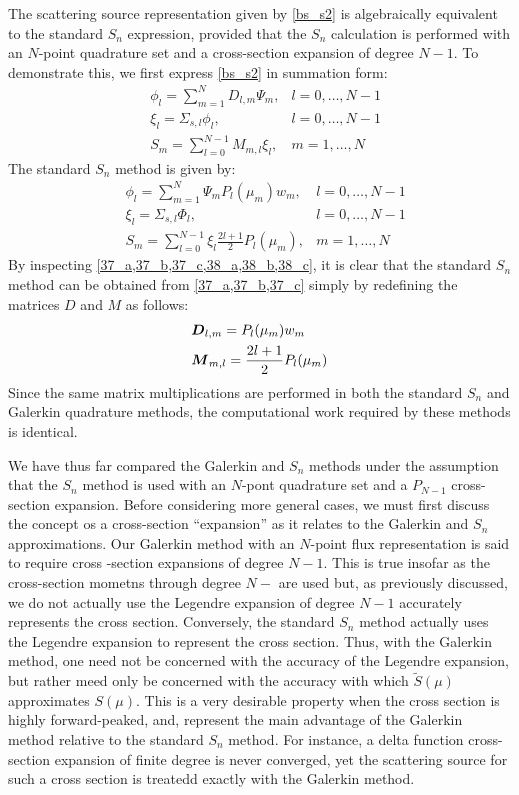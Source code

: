 The scattering source representation given by \cref{bs_s2} is
algebraically equivalent to the standard $S_n$ expression, provided that the
$S_n$ calculation is performed with an $N$-point quadrature set and a
cross-section expansion of degree $N-1$. To demonstrate this, we first express
\cref{bs_s2} in summation form:
\begin{align}
&\phi_l = \sum_{m=1}^N D_{l,m} \Psi_m, & l=0,\hdots,N-1 \label{37_a}\\
&\xi_l = \Sigma_{s,l} \phi_l, & l=0,\hdots,N-1 \label{37_b}\\
&S_m = \sum_{l=0}^{N-1} M_{m,l}\xi_l, & m=1,\hdots,N \label{37_c}
\end{align}
The standard $S_n$ method is given by:
\begin{align}
&\phi_l = \sum_{m=1}^N \Psi_m P_l(\mu_m) w_m, & l=0,\hdots,N-1 \label{38_a}\\
&\xi_l = \Sigma_{s,l} \Phi_l, & l=0,\hdots, N-1 \label{38_b} \\
&S_m = \sum_{l=0}^{N-1}\xi_l \frac{2l+1}{2}P_l(\mu_m), & m=1,\hdots,N
\label{38_c}
\end{align}
By inspecting \cref{37_a,37_b,37_c,38_a,38_b,38_c}, it is clear that the
standard $S_n$ method can be obtained from \cref{37_a,37_b,37_c} simply by
redefining the matrices $D$ and $M$ as follows:
\begin{align}
& \bs{D}_{l,m} = P_l(\mu_m) w_m \label{39_a}\\
& \bs{M}_{m,l} = \frac{2l+1}{2} P_l(\mu_m) \label{39_b}
\end{align}
Since the same matrix multiplications are performed in both the standard
$S_n$ and Galerkin quadrature methods, the computational work required by
these methods is identical.

We have thus far compared the Galerkin and $S_n$ methods under the assumption
that the $S_n$ method is used with an $N$-pont quadrature set and a $P_{N-1}$
cross-section expansion. Before considering more general cases, we must first
discuss the concept os a cross-section ``expansion'' as it relates to the
Galerkin and $S_n$ approximations. Our Galerkin method with an $N$-point flux
representation is said to require cross -section expansions of degree $N-1$.
This is true insofar as the cross-section mometns through degree $N-$ are used
but, as previously discussed, we do not actually use the Legendre expansion of
degree $N-1$ accurately represents the cross section. Conversely, the standard
$S_n$ method actually uses the Legendre expansion to represent the cross
section. Thus, with the Galerkin method, one need not be concerned with the
accuracy of the Legendre expansion, but rather meed only be concerned with the
accuracy with which $\tilde{S}(\mu)$ approximates $S(\mu)$. This is a very
desirable property when the cross section is highly forward-peaked, and,
represent the main advantage of the Galerkin method relative to the standard
$S_n$ method. For instance, a delta function cross-section expansion of finite
degree is never converged, yet the scattering source for such a cross section
is treatedd exactly with the Galerkin method.

